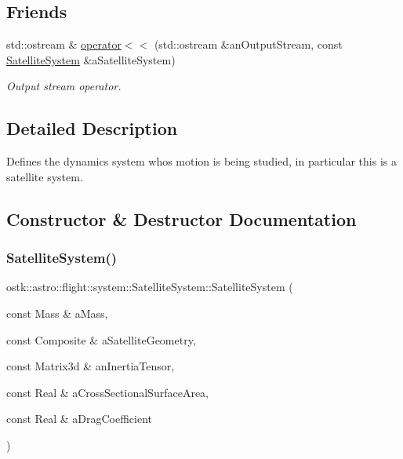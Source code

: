 \subsection*{Friends}
\begin{DoxyCompactItemize}
\item 
std\+::ostream \& \hyperlink{classostk_1_1astro_1_1flight_1_1system_1_1_satellite_system_aab00cabfb6e244285ddc39aae94d2190}{operator$<$$<$} (std\+::ostream \&an\+Output\+Stream, const \hyperlink{classostk_1_1astro_1_1flight_1_1system_1_1_satellite_system}{Satellite\+System} \&a\+Satellite\+System)
\begin{DoxyCompactList}\small\item\em Output stream operator. \end{DoxyCompactList}\end{DoxyCompactItemize}


\subsection{Detailed Description}
Defines the dynamics system who\textquotesingle{}s motion is being studied, in particular this is a satellite system. 

\subsection{Constructor \& Destructor Documentation}
\mbox{\label{classostk_1_1astro_1_1flight_1_1system_1_1_satellite_system_a92a2ae75e146b82f198b909e2c2787d7}} 
\subsubsection{\texorpdfstring{Satellite\+System()}{SatelliteSystem()}\hspace{0.1cm}{\footnotesize\ttfamily [1/2]}}
{\footnotesize\ttfamily ostk\+::astro\+::flight\+::system\+::\+Satellite\+System\+::\+Satellite\+System (\begin{DoxyParamCaption}\item[{const Mass \&}]{a\+Mass,  }\item[{const Composite \&}]{a\+Satellite\+Geometry,  }\item[{const Matrix3d \&}]{an\+Inertia\+Tensor,  }\item[{const Real \&}]{a\+Cross\+Sectional\+Surface\+Area,  }\item[{const Real \&}]{a\+Drag\+Coefficient }\end{DoxyParamCaption})}



